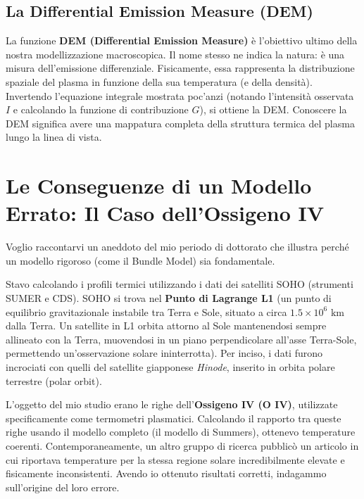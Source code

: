     \subsection{La Differential Emission Measure (DEM)}
    
    La funzione \textbf{DEM (Differential Emission Measure)} è l'obiettivo ultimo della nostra modellizzazione macroscopica. Il nome stesso ne indica la natura: è una misura dell'emissione differenziale. Fisicamente, essa rappresenta la distribuzione spaziale del plasma in funzione della sua temperatura (e della densità). Invertendo l'equazione integrale mostrata poc'anzi (notando l'intensità osservata $I$ e calcolando la funzione di contribuzione $G$), si ottiene la DEM. Conoscere la DEM significa avere una mappatura completa della struttura termica del plasma lungo la linea di vista.
    
\section{Le Conseguenze di un Modello Errato: Il Caso dell'Ossigeno IV}

Voglio raccontarvi un aneddoto del mio periodo di dottorato che illustra perché un modello rigoroso (come il Bundle Model) sia fondamentale.

Stavo calcolando i profili termici utilizzando i dati dei satelliti SOHO (strumenti SUMER e CDS). SOHO si trova nel \textbf{Punto di Lagrange L1} (un punto di equilibrio gravitazionale instabile tra Terra e Sole, situato a circa $1.5 \times 10^6\text{ km}$ dalla Terra. Un satellite in L1 orbita attorno al Sole mantenendosi sempre allineato con la Terra, muovendosi in un piano perpendicolare all'asse Terra-Sole, permettendo un'osservazione solare ininterrotta). Per inciso, i dati furono incrociati con quelli del satellite giapponese \textit{Hinode}, inserito in orbita polare terrestre (polar orbit).

L'oggetto del mio studio erano le righe dell'\textbf{Ossigeno IV (O IV)}, utilizzate specificamente come termometri plasmatici. Calcolando il rapporto tra queste righe usando il modello completo (il modello di Summers), ottenevo temperature coerenti.
Contemporaneamente, un altro gruppo di ricerca pubblicò un articolo in cui riportava temperature per la stessa regione solare incredibilmente elevate e fisicamente inconsistenti. Avendo io ottenuto risultati corretti, indagammo sull'origine del loro errore.

